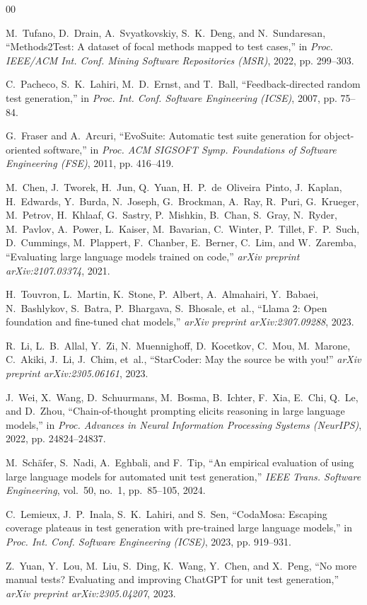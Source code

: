 \documentclass[conference]{IEEEtran}
\begin{document}
\begin{thebibliography}{00}

M.~Tufano, D.~Drain, A.~Svyatkovskiy, S.~K.~Deng, and N.~Sundaresan,
``Methods2Test: A dataset of focal methods mapped to test cases,''
in \textit{Proc. IEEE/ACM Int. Conf. Mining Software Repositories (MSR)},
2022, pp. 299--303.

C.~Pacheco, S.~K.~Lahiri, M.~D.~Ernst, and T.~Ball,
``Feedback-directed random test generation,''
in \textit{Proc. Int. Conf. Software Engineering (ICSE)},
2007, pp. 75--84.

G.~Fraser and A.~Arcuri,
``EvoSuite: Automatic test suite generation for object-oriented software,''
in \textit{Proc. ACM SIGSOFT Symp. Foundations of Software Engineering (FSE)},
2011, pp. 416--419.

M.~Chen, J.~Tworek, H.~Jun, Q.~Yuan, H.~P.~de~Oliveira~Pinto, J.~Kaplan, H.~Edwards, Y.~Burda, N.~Joseph, G.~Brockman, A.~Ray, R.~Puri, G.~Krueger, M.~Petrov, H.~Khlaaf, G.~Sastry, P.~Mishkin, B.~Chan, S.~Gray, N.~Ryder, M.~Pavlov, A.~Power, L.~Kaiser, M.~Bavarian, C.~Winter, P.~Tillet, F.~P.~Such, D.~Cummings, M.~Plappert, F.~Chanber, E.~Berner, C.~Lim, and W.~Zaremba,
``Evaluating large language models trained on code,''
\textit{arXiv preprint arXiv:2107.03374}, 2021.

H.~Touvron, L.~Martin, K.~Stone, P.~Albert, A.~Almahairi, Y.~Babaei, N.~Bashlykov, S.~Batra, P.~Bhargava, S.~Bhosale, et~al.,
``Llama 2: Open foundation and fine-tuned chat models,''
\textit{arXiv preprint arXiv:2307.09288}, 2023.

R.~Li, L.~B.~Allal, Y.~Zi, N.~Muennighoff, D.~Kocetkov, C.~Mou, M.~Marone, C.~Akiki, J.~Li, J.~Chim, et~al.,
``StarCoder: May the source be with you!''
\textit{arXiv preprint arXiv:2305.06161}, 2023.

J.~Wei, X.~Wang, D.~Schuurmans, M.~Bosma, B.~Ichter, F.~Xia, E.~Chi, Q.~Le, and D.~Zhou,
``Chain-of-thought prompting elicits reasoning in large language models,''
in \textit{Proc. Advances in Neural Information Processing Systems (NeurIPS)},
2022, pp. 24824--24837.

M.~Sch{\"a}fer, S.~Nadi, A.~Eghbali, and F.~Tip,
``An empirical evaluation of using large language models for automated unit test generation,''
\textit{IEEE Trans. Software Engineering}, vol.~50, no.~1, pp.~85--105, 2024.

C.~Lemieux, J.~P.~Inala, S.~K.~Lahiri, and S.~Sen,
``CodaMosa: Escaping coverage plateaus in test generation with pre-trained large language models,''
in \textit{Proc. Int. Conf. Software Engineering (ICSE)},
2023, pp. 919--931.

Z.~Yuan, Y.~Lou, M.~Liu, S.~Ding, K.~Wang, Y.~Chen, and X.~Peng,
``No more manual tests? Evaluating and improving ChatGPT for unit test generation,''
\textit{arXiv preprint arXiv:2305.04207}, 2023.

\end{thebibliography}
\end{document}
